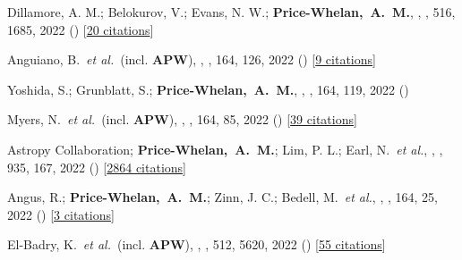 \item[{\color{deemph}\scriptsize108}]Dillamore, A. M.; Belokurov, V.; Evans, N. W.; \textbf{Price-Whelan,~A.~M.}, , \mnras, 516, 1685, 2022 () [\href{http://adsabs.harvard.edu/abs/2022MNRAS.516.1685D}{20 citations}]

\item[{\color{deemph}\scriptsize107}]Anguiano, B.~\textit{et al.}~(incl. \textbf{APW}), , \aj, 164, 126, 2022 () [\href{http://adsabs.harvard.edu/abs/2022AJ....164..126A}{9 citations}]

\item[{\color{deemph}\scriptsize106}]Yoshida, S.; Grunblatt, S.; \textbf{Price-Whelan,~A.~M.}, , \aj, 164, 119, 2022 ()

\item[{\color{deemph}\scriptsize105}]Myers, N.~\textit{et al.}~(incl. \textbf{APW}), , \aj, 164, 85, 2022 () [\href{http://adsabs.harvard.edu/abs/2022AJ....164...85M}{39 citations}]

\item[{\color{deemph}\scriptsize104}]Astropy Collaboration; \textbf{Price-Whelan,~A.~M.}; Lim, P. L.; Earl, N.~\textit{et al.}, , \apj, 935, 167, 2022 () [\href{http://adsabs.harvard.edu/abs/2022ApJ...935..167A}{2864 citations}]

\item[{\color{deemph}\scriptsize103}]Angus, R.; \textbf{Price-Whelan,~A.~M.}; Zinn, J. C.; Bedell, M.~\textit{et al.}, , \aj, 164, 25, 2022 () [\href{http://adsabs.harvard.edu/abs/2022AJ....164...25A}{3 citations}]

\item[{\color{deemph}\scriptsize102}]El-Badry, K.~\textit{et al.}~(incl. \textbf{APW}), , \mnras, 512, 5620, 2022 () [\href{http://adsabs.harvard.edu/abs/2022MNRAS.512.5620E}{55 citations}]

